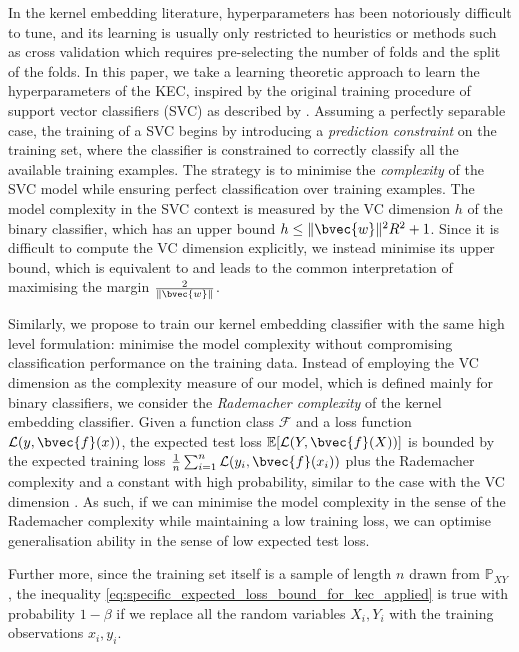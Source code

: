 \documentclass{article}
\begin{document}
	In the kernel embedding literature, hyperparameters has been notoriously difficult to tune, and its learning is usually only restricted to heuristics or methods such as cross validation which requires pre-selecting the number of folds and the split of the folds. In this paper, we take a learning theoretic approach to learn the hyperparameters of the KEC, inspired by the original training procedure of support vector classifiers (SVC) as described by \cite[p. 185]{m2001introduction}. Assuming a perfectly separable case, the training of a SVC begins by introducing a \textit{prediction constraint} on the training set, where the classifier is constrained to correctly classify all the available training examples. The strategy is to minimise the \textit{complexity} of the SVC model while ensuring perfect classification over training examples. The model complexity in the SVC context is measured by the VC dimension $h$ of the binary classifier, which has an upper bound $h \leq \lVert \bvec{w} \rVert^{2} R^{2} + 1$. Since it is difficult to compute the VC dimension explicitly, we instead minimise its upper bound, which is equivalent to and leads to the common interpretation of maximising the margin $\frac{2}{\lVert \bvec{w} \rVert}$.
	
	Similarly, we propose to train our kernel embedding classifier with the same high level formulation: minimise the model complexity without compromising classification performance on the training data. Instead of employing the VC dimension as the complexity measure of our model, which is defined mainly for binary classifiers, we consider the \textit{Rademacher complexity} of the kernel embedding classifier. Given a function class $\mathcal{F}$ and a loss function $\mathcal{L}(y, \bvec{f}(x))$, the expected test loss $\mathbb{E}[\mathcal{L}(Y, \bvec{f}(X))]$ is bounded by the expected training loss $\frac{1}{n}\sum_{i = 1}^{n} \mathcal{L}(y_{i}, \bvec{f}(x_{i}))$ plus the Rademacher complexity and a constant with high probability, similar to the case with the VC dimension \citep{bartlett2002rademacher}. As such, if we can minimise the model complexity in the sense of the Rademacher complexity while maintaining a low training loss, we can optimise generalisation ability in the sense of low expected test loss.
	
			Further more, since the training set itself is a sample of length $n$ drawn from $\mathbb{P}_{X Y}$, the inequality \eqref{eq:specific_expected_loss_bound_for_kec_applied} is true with probability $1 - \beta$ if we replace all the random variables $X_{i}, Y_{i}$ with the training observations $x_{i}, y_{i}$.
			
\end{document}
